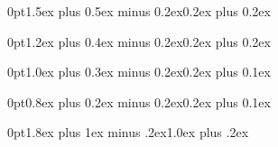 \titlespacing*{\section}
  {0pt}{1.5ex plus 0.5ex minus 0.2ex}{0.2ex plus 0.2ex}

\titlespacing*{\subsection}
  {0pt}{1.2ex plus 0.4ex minus 0.2ex}{0.2ex plus 0.2ex}

\titlespacing*{\subsubsection}
  {0pt}{1.0ex plus 0.3ex minus 0.2ex}{0.2ex plus 0.1ex}

\titlespacing*{\paragraph}
  {0pt}{0.8ex plus 0.2ex minus 0.2ex}{0.2ex plus 0.1ex}

\renewcommand{\figurename}{Hình}
\renewcommand{\tablename}{Bảng}

\makeatletter
{}
\makeatother

\renewcommand{\thefigure}{\thesection.\arabic{figure}}
\renewcommand{\thetable}{\thesection.\arabic{table}}

\usepackage{caption}


\titlespacing*{\subsubsection}
  {0pt}{1.8ex plus 1ex minus .2ex}{1.0ex plus .2ex}

